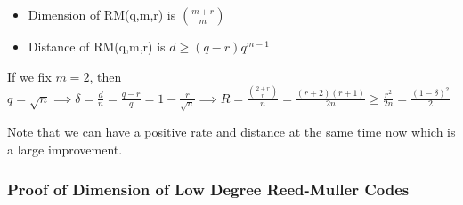\documentclass[letterpaper,12pt]{article}
\begin{document}
\begin{itemize}
    \item Dimension of RM(q,m,r) is $\binom{m+r}{m}$
    \item Distance of RM(q,m,r) is $d\ge (q-r)q^{m-1}$
\end{itemize}
If we fix $m=2$, then $q=\sqrt{n}\implies \delta = \frac{d}{n} = \frac{q-r}{q}=1-\frac{r}{\sqrt{n}} \implies R=\frac{\binom{2+r}{r}}{n}=\frac{(r+2)(r+1)}{2n}\ge \frac{r^2}{2n}=\frac{(1-\delta)^2}{2}$

Note that we can have a positive rate and distance at the same time now which is a large improvement. 

\subsubsection{Proof of Dimension of Low Degree Reed-Muller Codes}
\end{document}
